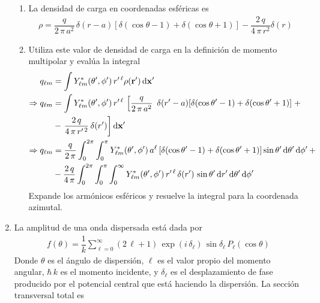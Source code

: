 \begin{enumerate}
\begin{enumerate}
\item La densidad de carga en coordenadas esféricas es
\begin{align*}
\rho = \dfrac{q}{2 \, \pi \, a^{2}} \, \delta(r -a) [\delta (\cos \theta - 1) + \delta (\cos \theta + 1)] - \dfrac{2 \, q}{4 \, \pi \, r^{2}} \delta(r)
\end{align*}
\item Utiliza este valor de densidad de carga en la definición de momento multipolar y evalúa la integral
\begin{align*}
q_{\ell m} &= \int Y_{\ell  m}^{*} (\theta^{\prime}, \phi^{\prime}) \, r^{\prime \, \ell} \rho (\vb{r}^{\prime}) \dd{\vb{x}^{\prime}} \\
\Rightarrow q_{\ell m} &= \int Y_{\ell  m}^{*} (\theta^{\prime}, \phi^{\prime}) \, r^{\prime \, \ell} \, \left[\dfrac{q}{2 \, \pi \, a^{2}} \ \, \delta(r^{\prime} - a) [\delta (\cos \theta^{\prime} - 1) + \delta (\cos \theta^{\prime} + 1)]  \right. + \\
&- \left. \dfrac{2 \, q}{4 \, \pi \, r^{\prime \, 2}} \, \delta(r^{\prime}) \right] \dd{\vb{x}^{\prime}} \\
\Rightarrow q_{\ell m} &= \dfrac{q}{2 \, \pi} \int_{0}^{2 \pi} \int_{0}^{\pi} Y_{\ell  m}^{*} (\theta^{\prime}, \phi^{\prime}) \, a^{\ell} \, [\delta (\cos \theta^{\prime} - 1) + \delta (\cos \theta^{\prime} + 1)] \sin \theta^{\prime} \dd{\theta^{\prime}} \dd{\phi^{\prime}} + \\
&- \dfrac{2 \, q}{4 \, \pi} \int_{0}^{2 \pi} \int_{0}^{\pi} \int_{0}^{\infty} Y_{\ell  m}^{*} (\theta^{\prime}, \phi^{\prime}) \, r^{\prime \, \ell} \, \delta(r^{\prime}) \, \sin \theta^{\prime} \dd{r^{\prime}} \dd{\theta^{\prime}} \dd{\phi^{\prime}}
\end{align*}
Expande los armónicos esféricos y resuelve la integral para la coordenada azimutal.
\end{enumerate}
\item La amplitud de una onda dispersada está dada por
\begin{align*}
f(\theta) = \dfrac{1}{k} \sum_{\ell = 0}^{\infty} (2 \, \ell + 1) \, \exp(i \, \delta_{\ell}) \, \sin \delta_{\ell} \, P_{\ell} (\cos \theta)
\end{align*}
Donde $\theta$ es el ángulo de dispersión, $\ell$ es el valor propio del momento angular, $\hbar \, k$ es el momento incidente, y $\delta_{\ell}$ es el desplazamiento de fase producido por el potencial central que está haciendo la dispersión. La sección transversal total es 

\end{enumerate}

